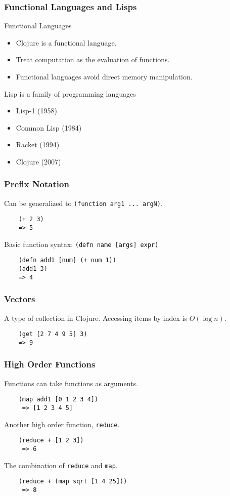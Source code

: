 \documentclass{beamer}
\newcommand{\comment}[1]{{\bf \tt  {#1}}}
\newcommand{\hfcomment}[1]{\textcolor{Teal}{\comment{Henry: {#1}}}}
\newcommand{\clocode}[1]{{\texttt {#1}}}
\begin{document}
\begin{frame}[fragile]
\frametitle{Functional Languages and Lisps}
	Functional Languages
	\begin{itemize}
	 \item Clojure is a functional language.
  	 \item Treat computation as the evaluation of functions.
  	 \item Functional languages avoid direct memory manipulation.
       \end{itemize}
	Lisp is a family of programming languages 
		\begin{itemize}
		 \item Lisp-1 (1958)
		 \item Common Lisp (1984)
		 \item Racket (1994)
		 \item Clojure	(2007)
		\end{itemize}
\end{frame}
\begin{frame}[fragile]
\frametitle{Prefix Notation}
Can be generalized to \clocode{(function arg1 ... argN)}.
	\begin{verbatim}
	(+ 2 3)
	=> 5
	\end{verbatim}
Basic function syntax: \clocode{(defn name [args] expr)}
	\begin{verbatim}
	(defn add1 [num] (+ num 1))
	(add1 3)
	=> 4
	\end{verbatim}
\end{frame}

\begin{frame}[fragile]
\frametitle{Vectors}
A type of collection in Clojure.
Accessing items by index is $O(\log n)$.
	\begin{verbatim}
	(get [2 7 4 9 5] 3)	
	=> 9
	\end{verbatim}
\end{frame}
\begin{frame}[fragile]
\frametitle{High Order Functions}
 Functions can take functions as arguments.
	\begin{verbatim}
	(map add1 [0 1 2 3 4])
	 => [1 2 3 4 5]
	\end{verbatim}
Another high order function, \clocode{reduce}.
	\begin{verbatim}
	(reduce + [1 2 3])
	 => 6
	\end{verbatim}
The combination of \clocode{reduce} and \clocode{map}.
	\begin{verbatim}
	(reduce + (map sqrt [1 4 25]))
	 => 8
	\end{verbatim}
\end{frame}
\end{document}
